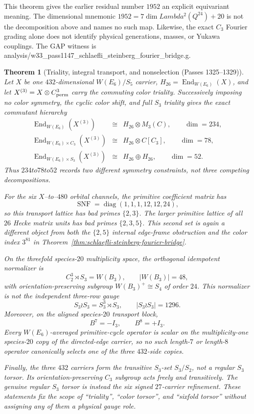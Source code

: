 \documentclass[12pt,a4paper]{article}
\def\mathbb#1{#1}%
\def\texttt#1{#1}%
\def\Lambda{Lambda}%
\def\to{ to }%
\newtheorem{theorem}{Theorem}[section]
\theoremstyle{definition}
\begin{document}
\noindent
This theorem gives the earlier residual number $1952$ an explicit
equivariant meaning.  The dimensional mnemonic
$1952=7\dim\Lambda^2(\mathbb Q^{24})+20$ is not the decomposition above
and names no such map.  Likewise, the exact $C_3$ Fourier grading alone
does not identify physical generations, masses, or Yukawa couplings.
The GAP witness is
\texttt{analysis/w33\_pass1147\_schlaefli\_steinberg\_fourier\_bridge.g}.

\begin{theorem}[Triality, integral transport, and nonselection
  (Passes 1325--1329)]
\label{thm:triality-integral-nonselection}
Let $X$ be one $432$-dimensional $W(E_6)/S_5$ carrier,
$H_{26}=\operatorname{End}_{W(E_6)}(X)$, and let
$X^{(3)}=X\otimes\mathbb C^3_{\rm perm}$ carry the commuting color
triality.  Successively imposing no color symmetry, the cyclic color
shift, and full $S_3$ triality gives the exact commutant hierarchy
\[
\begin{array}{ccl}
\operatorname{End}_{W(E_6)}(X^{(3)})
 &\cong&H_{26}\otimes M_3(\mathbb C),\qquad \dim=234,\\
\operatorname{End}_{W(E_6)\times C_3}(X^{(3)})
 &\cong&H_{26}\otimes\mathbb C[C_3],\qquad \dim=78,\\
\operatorname{End}_{W(E_6)\times S_3}(X^{(3)})
 &\cong&H_{26}\oplus H_{26},\qquad \dim=52.
\end{array}
\]
Thus $234\to78\to52$ records two different symmetry constraints, not
three competing decompositions.

For the six $X$--to--$480$ orbital channels, the primitive coefficient
matrix has
\[
 \operatorname{SNF}=\operatorname{diag}(1,1,1,12,12,24),
\]
so this transport lattice has bad primes $\{2,3\}$.  The larger primitive
lattice of all $26$ Hecke matrix units has bad primes
$\{2,3,5\}$.  This second set is again a different object from both the
$\{2,5\}$ internal edge-frame obstruction and the color index $3^{81}$
in Theorem~\ref{thm:schlaefli-steinberg-fourier-bridge}.

On the threefold species-$20$ multiplicity space, the orthogonal
idempotent normalizer is
\[
 C_2^3\rtimes S_3=W(B_3),\qquad |W(B_3)|=48,
\]
with orientation-preserving subgroup $W(B_3)^+\cong S_4$ of order $24$.
This normalizer is not the independent three-row gauge
\[
 S_3\wr S_3=S_3^3\rtimes S_3,\qquad |S_3\wr S_3|=1296.
\]
Moreover, on the aligned species-$20$ transport block,
\[
 B^7=-I_3,\qquad B^8=+I_3.
\]
Every $W(E_6)$-averaged primitive-cycle operator is scalar on the
multiplicity-one species-$20$ copy of the directed-edge carrier, so no
such length-$7$ or length-$8$ operator canonically selects one of the
three $432$-side copies.

Finally, the three $432$ carriers form the transitive $S_3$-set
$S_3/S_2$, not a regular $S_3$ torsor.  Its orientation-preserving
$C_3$ subgroup acts freely and transitively.  The genuine regular
$S_3$ torsor is instead the six signed $27$-carrier refinement.  These
statements fix the scope of ``triality'', ``color torsor'', and
``sixfold torsor'' without assigning any of them a physical gauge role.
\end{theorem}
\end{document}
